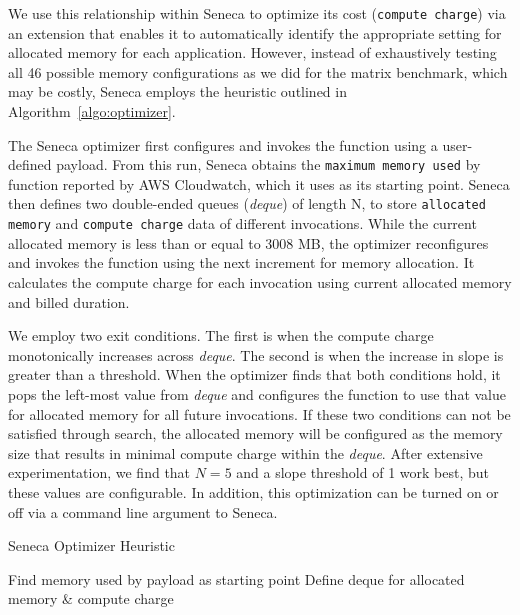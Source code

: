 We use this relationship within
Seneca to optimize its cost (\texttt{compute charge}) via an extension
that enables it to automatically identify the appropriate
setting for allocated memory for each application.
However, instead of exhaustively testing all 46 possible 
memory configurations as we did for the matrix benchmark, 
which may be costly,  Seneca employs the heuristic outlined in
Algorithm~\ref{algo:optimizer}. 

The Seneca optimizer first configures and invokes the function using a user-defined payload.  From this run, Seneca obtains the \texttt{maximum memory used}
by function reported by AWS Cloudwatch,
which it uses as its starting point.
Seneca then defines two double-ended queues 
(\textit{deque}) of length N, to store 
\texttt{allocated memory} and \texttt{compute charge} data of different invocations. While the current 
allocated memory is less than or equal to 3008 MB, 
the optimizer reconfigures and invokes the function 
using the next increment for memory allocation.  It 
calculates the compute charge for each invocation 
using current allocated memory and billed duration. 

We employ two exit conditions. The first is when the  compute charge monotonically increases across \textit{deque}. The second is when the increase in slope is greater than a threshold. When the optimizer finds that both conditions hold, it pops the left-most value from \textit{deque} and configures the function to use that value for allocated memory for all future invocations. If these two conditions can not be satisfied through search, the allocated memory will be configured as the memory size that results in minimal compute charge within the \textit{deque}. After extensive experimentation, we find that $N=5$ and a slope threshold of 1 work best, but these values are configurable. In addition, this optimization can be turned on or off via a command line argument to Seneca.

\begin{algorithm}[]
\caption{Seneca Optimizer Heuristic}
\label{algo:optimizer}
\SetAlgoLined
{}
Find memory used by payload as starting point\;
Define deque for allocated memory \& compute charge\;
\end{algorithm}

